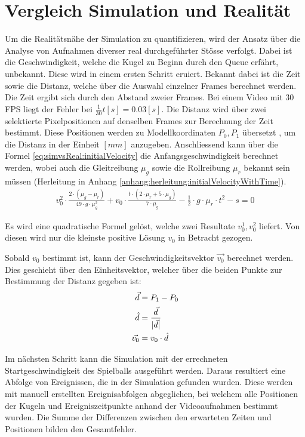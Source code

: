 \section{Vergleich Simulation und Realität}\label{kap:vergleich_simulation_und_realitaet}
Um die Realitätsnähe der Simulation zu quantifizieren, wird der Ansatz über die Analyse von Aufnahmen diverser real
durchgeführter Stösse verfolgt.
Dabei ist die Geschwindigkeit, welche die Kugel zu Beginn durch den Queue erfährt, unbekannt.
Diese wird in einem ersten Schritt eruiert.
Bekannt dabei ist die Zeit sowie die Distanz, welche über die Auswahl einzelner Frames berechnet werden.
Die Zeit ergibt sich durch den Abstand zweier Frames.
Bei einem Video mit 30 FPS liegt der Fehler bei $\frac{1}{30} t [s] = 0.03 [s]$.
Die Distanz wird über zwei selektierte Pixelpositionen auf denselben Frames zur Berechnung der Zeit bestimmt.
Diese Positionen werden zu Modellkoordinaten $P_0, P_1$ übersetzt \cite{project2:pixel_to_model_coordinates},
um die Distanz in der Einheit $[mm]$ anzugeben.
Anschliessend kann über die Formel \ref{eq:simvsReal:initialVelocity} die Anfangsgeschwindigkeit berechnet
werden, wobei auch die Gleitreibung $\mu_g$ sowie die Rollreibung $\mu_r$ bekannt sein müssen (Herleitung in Anhang \ref{anhang:herleitung:initialVelocityWithTime}).
\begin{align}
    v_0^2 \cdot \frac{2 \cdot (\mu_g - \mu_r)}{49 \cdot g \cdot \mu_g^2} + v_0 \cdot \frac{t \cdot (2 \cdot \mu_r + 5 \cdot \mu_g)}{7 \cdot \mu_g} - \frac{1}{2} \cdot g \cdot \mu_r \cdot t^2 - s = 0\label{eq:simvsReal:initialVelocity}
\end{align}

Es wird eine quadratische Formel gelöst, welche zwei Resultate $v^1_0, v^2_0$ liefert. Von diesen wird nur die
kleinste positive Lösung $v_0$ in Betracht gezogen.

Sobald $v_0$ bestimmt ist, kann der Geschwindigkeitsvektor $\vec{v_0}$ berechnet werden. Dies geschieht über den Einheitsvektor,
welcher über die beiden Punkte zur Bestimmung der Distanz gegeben ist:
\begin{align}
    \vec{d} &= P_1 - P_0\\
    \hat{d} &= \frac{\vec{d}}{\lvert \vec{d} \rvert}\\
    \vec{v_0} &= v_0 \cdot \hat{d}
\end{align}

Im nächsten Schritt kann die Simulation mit der errechneten Startgeschwindigkeit des Spielballs ausgeführt werden.
Daraus resultiert eine Abfolge von Ereignissen, die in der Simulation gefunden wurden.
Diese werden mit manuell erstellten Ereignisabfolgen abgeglichen, bei welchem alle Positionen der Kugeln und Ereigniszeitpunkte
anhand der Videoaufnahmen bestimmt wurden.
Die Summe der Differenzen zwischen den erwarteten Zeiten und Positionen bilden den Gesamtfehler.

